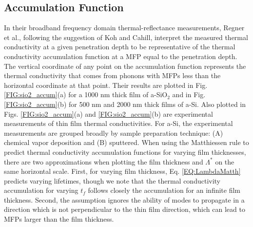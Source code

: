 \documentclass[aps,prb,onecolumn,preprint,superscriptaddress,footinbib,amsmath,amssymb,floatfix]{revtex4}
\begin{document}

\subsection{\label{S:Accumulation}Accumulation Function}

In their broadband frequency domain thermal-reflectance 
measurements, Regner et al.,\cite{regner_broadband_2013}  
following the suggestion of Koh and Cahill,\cite{koh_frequency_2007} 
interpret the  
measured thermal conductivity at a given penetration depth 
to be representative of the thermal conductivity accumulation function 
at a MFP equal to the penetration depth.
\cite{dames_thermal_2005,yang_mean_2013} The vertical coordinate 
of any point on the accumulation function represents the thermal 
conductivity that comes from phonons with MFPs less than the horizontal 
coordinate at that point. 
Their results are plotted in Fig. \ref{FIG:sio2_accum}(a) 
for a 1000 nm thick film of a-SiO$_2$ 
and in Fig. \ref{FIG:sio2_accum}(b) for 500 nm and 
2000 nm thick films of a-Si. Also plotted in 
Figs. \ref{FIG:sio2_accum}(a) and \ref{FIG:sio2_accum}(b) 
are experimental measurements of thin film thermal 
conductivities. For a-Si, the experimental measurements are grouped 
broadly by sample preparation technique: 
(A) chemical vapor deposition
\cite{moon_thermal_2002,liu_high_2009,yang_anomalously_2010}
and (B) sputtered.
\cite{kuo_thermal_1992,cahill_thermal_1994,wada_thermal_1996} 
When using the Matthiessen rule to predict thermal conductivity 
accumulation functions for varying film thicknesses, there are 
two approximations when plotting the film thickness and $\Lambda^*$ 
on the same horizontal scale. First, for varying film thickness, 
Eq. \eqref{EQ:LambdaMatth} predicts varying lifetimes, though we note that  
the thermal conductivity accumulation for varying $t_f$ follows closely 
the accumulation for an infinite film thickness. Second, the assumption 
ignores the ability of modes to propagate in a direction which is not 
perpendicular to the thin film direction, which can 
lead to MFPs larger than the film thickness.
\cite{sellan_cross-plane_2010,mcgaughey_size-dependent_2011,
jain_phonon_2013}
\end{document}
